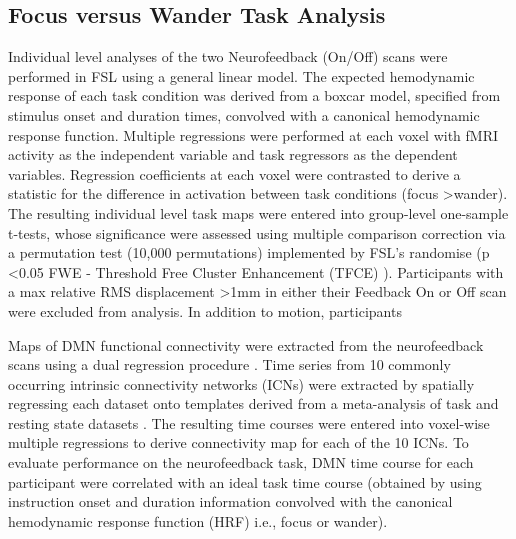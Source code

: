\subsection{Focus versus Wander Task Analysis}

Individual level analyses of the two Neurofeedback (On/Off) scans were performed in FSL using a general linear model. The expected hemodynamic response of each task condition was derived from a boxcar model, specified from stimulus onset and duration times, convolved with a canonical hemodynamic response function. Multiple regressions were performed at each voxel with fMRI activity as the independent variable and task regressors as the dependent variables. Regression coefficients at each voxel were contrasted to derive a statistic for the difference in activation between task conditions (focus \textgreater wander). The resulting individual level task maps were entered into group-level one-sample t-tests, whose significance were assessed using multiple comparison correction via a permutation test (10,000 permutations) implemented by FSL's randomise (p \textless 0.05 FWE - Threshold Free Cluster Enhancement (TFCE) \cite{Smith_2009b,Winkler_2014,Salimi_Khorshidi_2011}). Participants with a max relative RMS displacement \textgreater 1mm in either their Feedback On or Off scan were excluded from analysis. In addition to motion, participants 

Maps of DMN functional connectivity were extracted from the neurofeedback scans using a dual regression procedure \cite{Filippini_2009}. Time series from 10 commonly occurring intrinsic connectivity networks (ICNs) were extracted by spatially regressing each dataset onto templates derived from a meta-analysis of task and resting state datasets \cite{Smith_2009a}. The resulting time courses were entered into voxel-wise multiple regressions to derive connectivity map for each of the 10 ICNs. To evaluate performance on the neurofeedback task, DMN time course for each participant were correlated with an ideal task time course (obtained by using instruction onset and duration information convolved with the canonical hemodynamic response function (HRF)  i.e., focus or wander).




